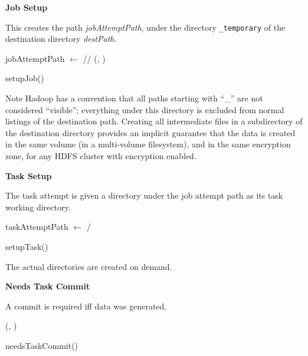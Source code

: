 \documentclass[conference]{IEEEtran}
\begin{document}
\textbf{Job Setup}

This creates the path \emph{jobAttemptPath}, under the
directory \texttt{\_temporary} of the destination directory
\emph{destPath}.

\begin{procedure}
\FileOutputCommitVars

  jobAttemptPath $\longleftarrow$ \dest/\temp/\jobAttemptId\;
  \mkdir(\fs, \jobAttemptPath)\;
\caption{setupJob()}
\end{procedure}

Note Hadoop has a convention that all paths starting with ``\_'' are not considered
``visible'';
everything under this directory is excluded from normal
listings of the destination path.
Creating all intermediate files in a subdirectory of the destination
directory provides an implicit guarantee that the data is created in the
same volume (in a multi-volume filesystem), and in the same encryption zone,
for any HDFS cluster with encryption enabled.


\textbf{Task Setup}

The task attempt is given a directory under the job attempt path
as its task working directory.

\begin{procedure}
\FileOutputCommitVars

taskAttemptPath $\longleftarrow$ \jobAttemptPath/\taskAttemptId\;
\caption{setupTask()}
\end{procedure}

The actual directories are created on demand.


\textbf{Needs Task Commit}

A commit is required iff data was generated.

\begin{function}
\FileOutputCommitVars

  \exists(\fs, \taskAttemptPath)\;
\caption{needsTaskCommit()}
\end{function}
\end{document}
